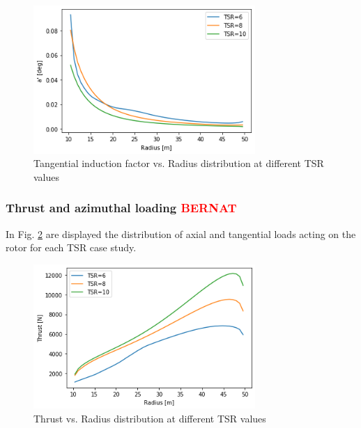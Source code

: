 \begin{figure}[htbp]
\includegraphics[width=0.75\textwidth]{./img/ap_plt_alligned.png}
\caption{Tangential induction factor vs. Radius distribution at different TSR values}
\centering
\label{ap_alligned}
\end{figure}



\subsubsection{\textbf{Thrust and azimuthal loading} \textcolor{red}{BERNAT}}

In Fig. \ref{thrust_alligned} are displayed the distribution of axial and tangential loads acting on the rotor for each TSR case study. 

\begin{figure}[htbp]
\includegraphics[width=0.75\textwidth]{./img/thrust_plt_alligned.png}
\caption{Thrust vs. Radius distribution at different TSR values}
\centering
\label{thrust_alligned}
\end{figure}

